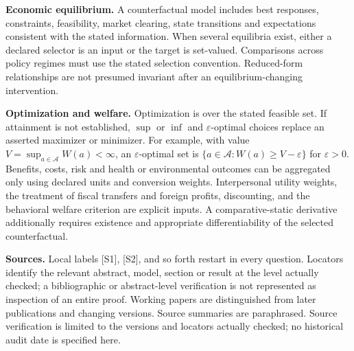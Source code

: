 \documentclass[11pt,a4paper]{article}
\begin{document}
\textbf{Economic equilibrium.} A counterfactual model includes best responses, constraints, feasibility, market clearing, state transitions and expectations consistent with the stated information. When several equilibria exist, either a declared selector is an input or the target is set-valued. Comparisons across policy regimes must use the stated selection convention. Reduced-form relationships are not presumed invariant after an equilibrium-changing intervention.

\textbf{Optimization and welfare.} Optimization is over the stated feasible set. If attainment is not established, $\sup$ or $\inf$ and $\varepsilon$-optimal choices replace an asserted maximizer or minimizer. For example, with value $V=\sup_{a\in\mathcal A}W(a)<\infty$, an $\varepsilon$-optimal set is $\{a\in\mathcal A:W(a)\geq V-\varepsilon\}$ for $\varepsilon>0$. Benefits, costs, risk and health or environmental outcomes can be aggregated only using declared units and conversion weights. Interpersonal utility weights, the treatment of fiscal transfers and foreign profits, discounting, and the behavioral welfare criterion are explicit inputs. A comparative-static derivative additionally requires existence and appropriate differentiability of the selected counterfactual.

\textbf{Sources.} Local labels [S1], [S2], and so forth restart in every question. Locators identify the relevant abstract, model, section or result at the level actually checked; a bibliographic or abstract-level verification is not represented as inspection of an entire proof. Working papers are distinguished from later publications and changing versions. Source summaries are paraphrased. Source verification is limited to the versions and locators actually checked; no historical audit date is specified here.
\end{document}
